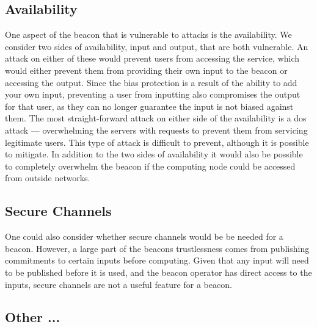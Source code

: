 \subsection{Availability}
One aspect of the beacon that is vulnerable to attacks is the availability. We consider two sides of availability, input and output, that are both vulnerable. An attack on either of these would prevent users from accessing the service, which would either prevent them from providing their own input to the beacon or accessing the output. Since the bias protection is a result of the ability to add your own input, preventing a user from inputting also compromises the output for that user, as they can no longer guarantee the input is not biased against them.
The most straight-forward attack on either side of the availability is a \gls{dos} attack --- overwhelming the servers with requests to prevent them from servicing legitimate users. This type of attack is difficult to prevent, although it is possible to mitigate. %
In addition to the two sides of availability it would also be possible to completely overwhelm the beacon if the computing node could be accessed from outside networks.

\subsection{Secure Channels}
One could also consider whether secure channels would be be needed for a beacon. However, a large part of the beacons trustlessness comes from publishing commitments to certain inputs before computing. Given that any input will need to be published before it is used, and the beacon operator has direct access to the inputs, secure channels are not a useful feature for a beacon.

\subsection{Other ...}
